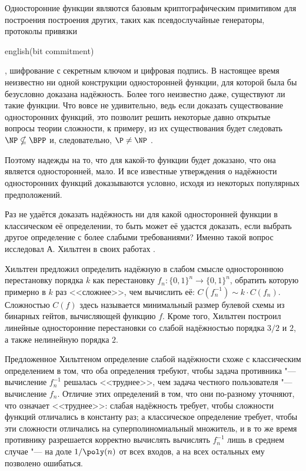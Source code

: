 \documentclass[oneside, a4paper]{article}
\theoremstyle{plain}
\theoremstyle{remark}
\begin{document}
Односторонние функции являются базовым криптографическим примитивом для
построения построения других, таких как псевдослучайные генераторы, протоколы
привязки \begin{foreignlanguage}{english}(bit commitment)\end{foreignlanguage},
шифрование с секретным ключом и цифровая подпись. В настоящее время неизвестно
ни одной конструкции односторонней функции, для которой была бы безусловно
доказана надёжность. Более того неизвестно даже, существуют ли такие функции.
Что вовсе не удивительно, ведь если доказать существование односторонних
функций, это позволит решить некоторые давно открытые вопросы теории
сложности, к примеру, из их существования будет следовать $\NP \nsubseteq
\BPP$ и, следовательно, $\P \neq \NP$ \cite{goldreich}.

Поэтому надежды на то, что для какой-то функции будет доказано, что она является
односторонней, мало. И все известные утверждения о надёжности односторонних
функций доказываются условно, исходя из некоторых популярных предположений.

Раз не удаётся доказать надёжность ни для какой односторонней функции в
классическом её определении, то быть может её удастся доказать, если выбрать
другое определение с более слабыми требованиями? Именно такой вопрос исследовал
А. Хильтген в своих работах \cite{hiltgen1993,hiltgen1994}.

Хильтген предложил определить надёжную в слабом смысле одностороннюю
перестановку порядка $k$ как перестановку $f_n : \{0, 1\}^n \to \{0, 1\}^n$,
обратить которую примерно в $k$ раз <<сложнее>>, чем вычислить её: $C(f_n^{-1})
\sim k \cdot C(f_n)$. Сложностью $C(f)$ здесь называется минимальный размер
булевой схемы из бинарных гейтов, вычисляющей функцию $f$. Кроме того, Хильтген
построил линейные односторонние перестановки со слабой надёжностью порядка $3/2$
и $2$, а также нелинейную порядка $2$.

Предложенное Хильтгеном определение слабой надёжности схоже с классическим
определением в том, что оба определения требуют, чтобы задача противника "---
вычисление $f_n^{-1}$ решалась <<труднее>>, чем задача честного пользователя
"--- вычисление $f_n$. Отличие этих определений в том, что они по-разному
уточняют, что означает <<труднее>>: слабая надёжность требует, чтобы сложности
функций отличались в константу раз; а классическое определение требует, чтобы
эти сложности отличались на суперполиномиальный множитель, и в то же время
противнику разрешается корректно вычислять вычислять $f_n^{-1}$ лишь в среднем
случае "--- на доле $1 / \poly(n)$ от всех входов, а на всех остальных ему
позволено ошибаться.
\end{document}
